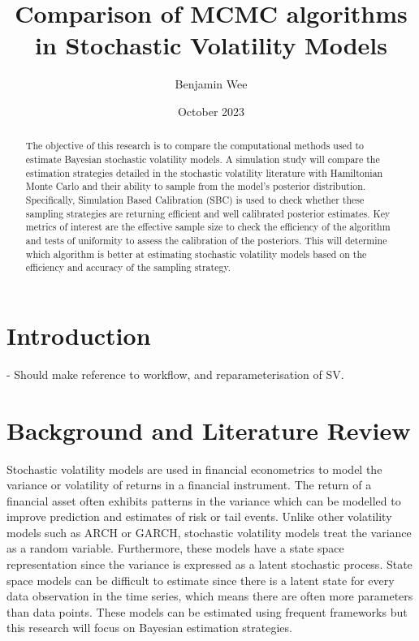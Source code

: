 \documentclass[12pt, a4paper]{article}
\title{Comparison of MCMC algorithms in Stochastic Volatility Models}
\author{Benjamin Wee}
\date{October 2023}
\begin{document}
\maketitle

\begin{abstract}
    The objective of this research is to compare the computational methods used to estimate Bayesian stochastic volatility models. A simulation study will compare the estimation strategies detailed in the stochastic volatility literature with Hamiltonian Monte Carlo and their ability to sample from the model's posterior distribution. Specifically, Simulation Based Calibration (SBC) is used to check whether these sampling strategies are returning efficient and well calibrated posterior estimates. Key metrics of interest are the effective sample size to check the efficiency of the algorithm and tests of uniformity to assess the calibration of the posteriors. This will determine which algorithm is better at estimating stochastic volatility models based on the efficiency and accuracy of the sampling strategy.
\end{abstract}

\section{Introduction}

- Should make reference to workflow, and reparameterisation of SV.

\section{Background and Literature Review}
    Stochastic volatility models are used in financial econometrics to model the variance or volatility of returns in a financial instrument. The return of a financial asset often exhibits patterns in the variance which can be modelled to improve prediction and estimates of risk or tail events. Unlike other volatility models such as ARCH or GARCH, stochastic volatility models treat the variance as a random variable. Furthermore, these models have a state space representation since the variance is expressed as a latent stochastic process. State space models can be difficult to estimate since there is a latent state for every data observation in the time series, which means there are often more parameters than data points. These models can be estimated using frequent frameworks but this research will focus on Bayesian estimation strategies.
\end{document}

